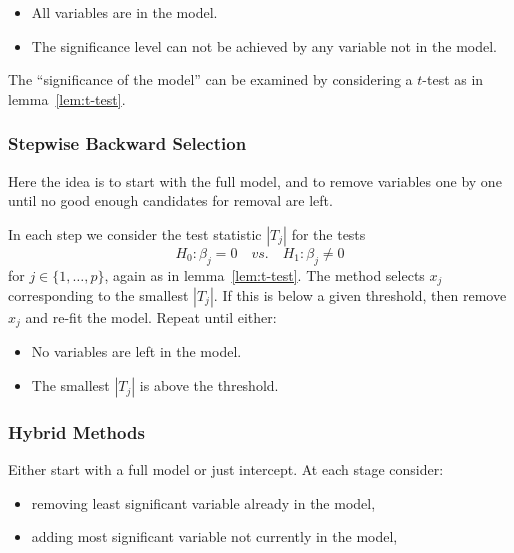 \documentclass[
  a4paper,
]{article}
\providecommand{\tightlist}{%
  \setlength{\itemsep}{0pt}\setlength{\parskip}{0pt}}
\theoremstyle{definition}
\theoremstyle{definition}
\theoremstyle{definition}
\theoremstyle{definition}
\theoremstyle{remark}
\begin{document}
\begin{itemize}
\tightlist
\item
  All variables are in the model.
\item
  The significance level can not be achieved by any variable not in the model.
\end{itemize}

The ``significance of the model'' can be examined by considering a
\(t\)-test as in lemma~\ref{lem:t-test}.

\hypertarget{stepwise-backward-selection}{%
\subsubsection{Stepwise Backward Selection}\label{stepwise-backward-selection}}

Here the idea is to start with the full model, and to remove variables
one by one until no good enough candidates for removal are left.

In each step we consider the test statistic \(|T_j|\) for the tests
\begin{equation*}
  H_0\colon \beta_j = 0
  \quad \textit{vs.} \quad
  H_1\colon \beta_j \neq 0
\end{equation*}
for \(j \in \{1, \ldots, p\}\), again as in lemma~\ref{lem:t-test}.
The method selects \(x_j\) corresponding to the smallest \(|T_j|\).
If this is below a given threshold, then remove \(x_j\) and re-fit the model.
Repeat until either:

\begin{itemize}
\tightlist
\item
  No variables are left in the model.
\item
  The smallest \(|T_j|\) is above the threshold.
\end{itemize}

\hypertarget{hybrid-methods}{%
\subsubsection{Hybrid Methods}\label{hybrid-methods}}

Either start with a full model or just intercept. At each stage consider:

\begin{itemize}
\tightlist
\item
  removing least significant variable already in the model,
\item
  adding most significant variable not currently in the model,
\end{itemize}
\end{document}
